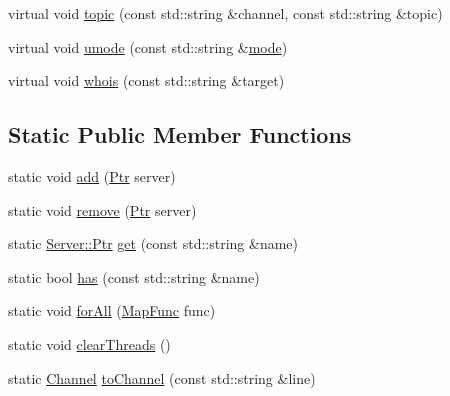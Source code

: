 \begin{DoxyCompactItemize}
virtual void \hyperlink{a00055_ab160b7973bb72bd5d415d9b8bc2120d5}{topic} (const std\-::string \&channel, const std\-::string \&topic)
\begin{DoxyCompactList}\small\item\em \end{DoxyCompactList}\item 
virtual void \hyperlink{a00055_a3c09948011f3a16e511959f4413007ac}{umode} (const std\-::string \&\hyperlink{a00055_ae3b4e6d84d6590785570686067052fbb}{mode})
\begin{DoxyCompactList}\small\item\em \end{DoxyCompactList}\item 
virtual void \hyperlink{a00055_a15a0f221b7a66ffcb08d849e9a7593bf}{whois} (const std\-::string \&target)
\begin{DoxyCompactList}\small\item\em \end{DoxyCompactList}\end{DoxyCompactItemize}
\subsection*{Static Public Member Functions}
\begin{DoxyCompactItemize}
\item 
static void \hyperlink{a00055_a2f9c9ee30b3008c921d72541536c4554}{add} (\hyperlink{a00055_aea3f9694df81348b909814ac6f84f874}{Ptr} server)
\item 
static void \hyperlink{a00055_a75ae92b856b2afe8d690eefca601c02a}{remove} (\hyperlink{a00055_aea3f9694df81348b909814ac6f84f874}{Ptr} server)
\item 
static \hyperlink{a00055_aea3f9694df81348b909814ac6f84f874}{Server\-::\-Ptr} \hyperlink{a00055_ad0490913aa99c4f2d8632c623ae2af77}{get} (const std\-::string \&name)
\item 
static bool \hyperlink{a00055_a38ef2a7786ff1dbc648f91177311b879}{has} (const std\-::string \&name)
\item 
static void \hyperlink{a00055_a5721b5e8cd9f441f888274ac67509491}{for\-All} (\hyperlink{a00055_a1f98346943a3940d8ef973d4816a6b46}{Map\-Func} func)
\item 
static void \hyperlink{a00055_a7201e07b0828b7af3856d91e2a46c2be}{clear\-Threads} ()
\item 
static \hyperlink{a00004}{Channel} \hyperlink{a00055_ab2c3eb4497b80fb7dbd24ef0975bc493}{to\-Channel} (const std\-::string \&line)
\end{DoxyCompactItemize}

